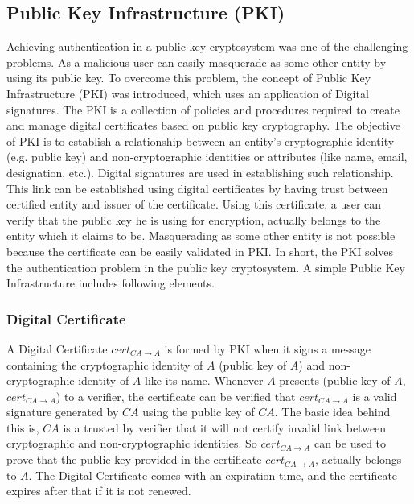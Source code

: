 \subsection{Public Key Infrastructure (PKI)}
Achieving authentication in a public key cryptosystem was one of the challenging problems. As a malicious user can easily masquerade as some other entity by using its public key. To overcome this problem, the concept of Public Key Infrastructure (PKI)  was introduced, which uses an application of Digital signatures. The PKI is a collection of policies and procedures required to create and manage digital certificates based on public key cryptography. The objective of PKI is to establish a relationship between an entity's cryptographic identity (e.g. public key) and non-cryptographic identities or attributes (like name, email, designation, etc.). Digital signatures are used in establishing such relationship. This link can be established using digital certificates by having trust between certified entity and issuer of the certificate. Using this certificate, a user can verify that the public key he is using for encryption, actually belongs to the entity which it claims to be. Masquerading as some other entity is not possible because the certificate can be easily validated in PKI. In short, the PKI solves the authentication problem in the public key cryptosystem. A simple Public Key Infrastructure includes following elements.
\subsubsection{Digital Certificate} A Digital Certificate $cert_{CA \rightarrow A}$ is formed by PKI when it signs a message containing the cryptographic identity of $A$ (public key of $A$) and non-cryptographic identity of $A$ like its name. Whenever $A$ presents (public key of $A$, $cert_{CA \rightarrow A}$) to a verifier, the certificate can be verified that $cert_{CA \rightarrow A}$ is a valid signature generated by $CA$ using the public key of $CA$. The basic idea behind this is, $CA$ is a trusted by verifier that it will not certify invalid link between cryptographic and non-cryptographic identities. So $cert_{CA \rightarrow A}$ can be used to prove that the public key provided in the certificate $cert_{CA \rightarrow A}$, actually belongs to $A$. The Digital Certificate comes with an expiration time, and the certificate expires after that if it is not renewed.

